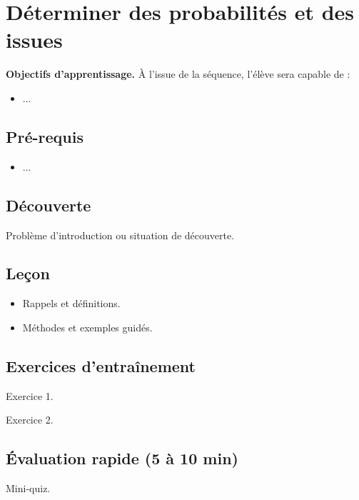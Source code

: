 \chapter{Déterminer des probabilités et des issues}
\label{chap:seq17}

\begin{definitionbox}
\textbf{Objectifs d'apprentissage.} À l'issue de la séquence, l'élève sera capable de :
\begin{itemize}
  \item ...
\end{itemize}
\end{definitionbox}

\section*{Pré-requis}
\begin{itemize}
  \item ...
\end{itemize}

\section{Découverte}
\begin{examplebox}
Problème d'introduction ou situation de découverte.
\end{examplebox}

\section{Leçon}
\begin{itemize}
  \item Rappels et définitions.
  \item Méthodes et exemples guidés.
\end{itemize}

\section{Exercices d'entraînement}
\begin{exercisebox}
Exercice 1.
\end{exercisebox}

\begin{exercisebox}
Exercice 2.
\end{exercisebox}

\section{Évaluation rapide (5 à 10 min)}
\begin{exercisebox}
Mini-quiz.
\end{exercisebox}
